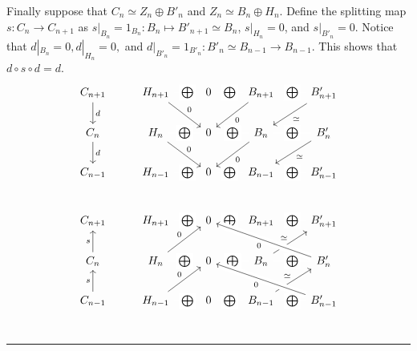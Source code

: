 \begin{solution}
Finally suppose that $C_n\simeq Z_n\oplus B'_{n}$ and $Z_n\simeq B_n\oplus H_n$. Define the splitting map $s:C_n\rightarrow C_{n+1}$ as $s|_{B_n}=1_{B_n}:B_n\mapsto B'_{n+1}\simeq B_n$, $s|_{H_n}=0$, and $s|_{B'_{n}}=0$. Notice that $d|_{B_n}=0, d|_{H_n}=0,$ and $d|_{B'_{n}}=1_{B'_{n}}:B'_{n}\simeq B_{n-1}\rightarrow B_{n-1}$. This shows that $d\circ s\circ d=d$.
\begin{equation}
\begin{tikzcd}
C_{n+1}\arrow{d}{d}&H_{n+1}\arrow{rd}{0}\arrow[white, dash]{r}[black,description]{\bigoplus}&0\arrow[white, dash]{r}[black,description]{\bigoplus}&B_{n+1}\arrow[white, dash]{r}[black,description]{\bigoplus}\arrow{ld}{0}&B'_{n+1}\arrow{ld}{\simeq}\\
C_{n}\arrow{d}{d}&H_{n}\arrow{rd}{0}\arrow[white, dash]{r}[black,description]{\bigoplus}&0\arrow[white, dash]{r}[black,description]{\bigoplus}&B_{n}\arrow[white, dash]{r}[black,description]{\bigoplus}\arrow{ld}{0}&B'_{n}\arrow{ld}{\simeq}\\
C_{n-1}&H_{n-1}\arrow[white, dash]{r}[black,description]{\bigoplus}&0\arrow[white, dash]{r}[black,description]{\bigoplus}&B_{n-1}\arrow[white, dash]{r}[black,description]{\bigoplus}&B'_{n-1}\\
\end{tikzcd}
\end{equation}
\begin{equation}
\begin{tikzcd}
C_{n+1}&H_{n+1}\arrow[white, dash]{r}[black,description]{\bigoplus}&0\arrow[white, dash]{r}[black,description]{\bigoplus}&B_{n+1}\arrow[white, dash]{r}[black,description]{\bigoplus}&B'_{n+1}\\
C_{n}\arrow{u}{s}&H_{n}\arrow{ru}{0}\arrow[white, dash]{r}[black,description]{\bigoplus}&0\arrow[white, dash]{r}[black,description]{\bigoplus}&B_{n}\arrow[white, dash]{r}[black,description]{\bigoplus}\arrow{ur}{\simeq}&B'_{n}\arrow[ull, crossing over,"0"]\\
C_{n-1}\arrow{u}{s}&H_{n-1}\arrow{ru}{0}\arrow[white, dash]{r}[black,description]{\bigoplus}&0\arrow[white, dash]{r}[black,description]{\bigoplus}&B_{n-1}\arrow[white, dash]{r}[black,description]{\bigoplus}\arrow{ur}{\simeq}&B'_{n-1}\arrow[ull, crossing over,"0"]\\
\end{tikzcd}
\end{equation}
\end{solution}
\noindent\rule{\textwidth}{1pt}
\newline
